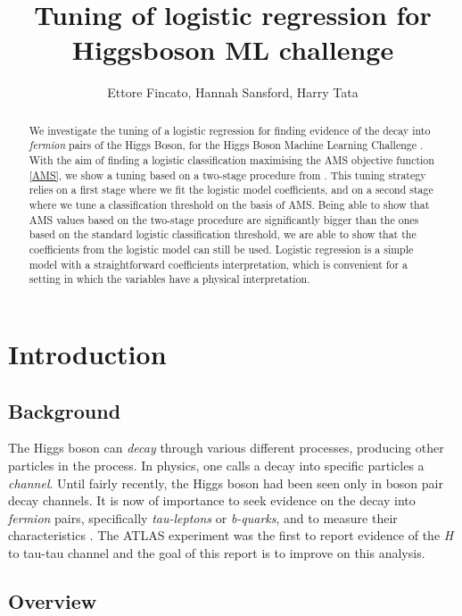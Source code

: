 \documentclass[]{article}
\title{Tuning of logistic regression for Higgsboson ML challenge}
\author{Ettore Fincato, Hannah Sansford, Harry Tata}
\begin{document}
\maketitle

\begin{abstract}

We investigate the tuning of a logistic regression for finding evidence of the decay into \textit{fermion} pairs of the Higgs Boson, for the Higgs Boson Machine Learning Challenge \cite{higgs-challenge}. With the aim of finding a logistic classification maximising the AMS objective function \ref{AMS}, we show a tuning based on a two-stage procedure from \cite{kotlowski2014consistent}. This tuning strategy relies on a first stage where we fit the logistic model coefficients, and on a second stage where we tune a classification threshold on the basis of AMS. Being able to show that AMS values based on the two-stage procedure are significantly bigger than the ones based on the standard logistic classification threshold, we are able to show that the coefficients from the logistic model can still be used. Logistic regression is a simple model with a straightforward coefficients interpretation, which is convenient for a setting in which the variables have a physical interpretation.

\end{abstract}

\section{Introduction}

\subsection{Background}

The Higgs boson can \textit{decay} through various different processes, producing other particles in the process. In physics, one calls a decay into specific particles a \textit{channel}. Until fairly recently, the Higgs boson had been seen only in boson pair decay channels. It is now of importance to seek evidence on the decay into \textit{fermion} pairs, specifically \textit{tau-leptons} or \textit{b-quarks}, and to measure their characteristics \cite{higgs-challenge}. The ATLAS experiment \cite{ATLAS-experiment} was the first to report evidence of the \textit{H} to tau-tau channel and the goal of this report is to improve on this analysis.


\subsection{Overview}
\end{document}
